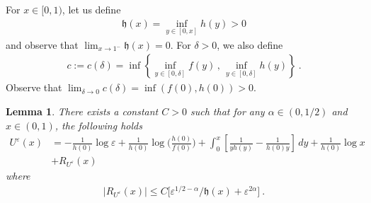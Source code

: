 \documentclass[reqno, 12pt, a4paper]{amsart}
\theoremstyle{plain}
\newtheorem{lemma}[theorem]{Lemma}
\theoremstyle{definition}
\begin{document}
For $x\in [0,1)$, let us define
\begin{equation}
\label{eq:h}
\begin{split}
{\mathfrak h}(x)= \inf_{y \in [0,x]} h(y) >0 
\end{split}
\end{equation}
and observe that $\lim_{x \to 1^-} {\mathfrak h}(x)=0$. For $\delta>0$, we also define 
\begin{equation}
\label{eq:cdelta}
\begin{split}
c:=c(\delta)=\inf\left\{  \inf_{y \in [0,\delta]} f(y)\, , \, \inf_{y \in[0,\delta]} h(y) \right\} \ .
\end{split}
\end{equation}
Observe that $\lim_{\delta \to 0} c(\delta) = \inf(f(0), h(0))>0$.

\begin{lemma}
\label{lem:expU}
There exists a constant $C>0$ such that for any $\alpha \in (0,1/2)$ and $x\in (0,1)$, the following holds
\begin{equation}
\label{eq:exp-Uvarepsilon}
\begin{split}
U^\varepsilon(x) &= -\frac{1}{h(0)} \log \varepsilon +  \frac{1}{h(0)}  \log \Big(\frac{h(0)}{f(0)} \Big) +  \int_{0}^x \left[ \frac{1}{y h(y)} -\frac{1}{h(0)y} \right] \, dy  +  \frac{1}{h(0)} \log x \\
& + R_{U^\varepsilon} (x) 
\end{split}
\end{equation}
where 
\begin{equation}
\begin{split}
\vert R_{U^\varepsilon} (x) \vert \le C \big[ \varepsilon^{1/2 - \alpha}/ {\mathfrak h}(x) + \varepsilon^{2\alpha}   \big] \ .
\end{split}
\end{equation}
\end{lemma}
\end{document}
